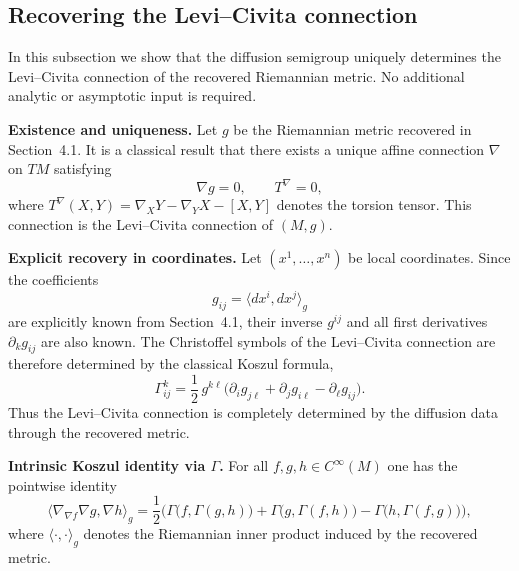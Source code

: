 \documentclass[11pt]{amsart}
\theoremstyle{definition}
\theoremstyle{remark}
\begin{document}
\subsection{Recovering the Levi--Civita connection}\label{subsec:recover-connection}

In this subsection we show that the diffusion semigroup uniquely determines the
Levi--Civita connection of the recovered Riemannian metric.
No additional analytic or asymptotic input is required.

\medskip
\noindent\textbf{Existence and uniqueness.}
Let $g$ be the Riemannian metric recovered in Section~4.1.
It is a classical result that there exists a unique affine connection $\nabla$
on $TM$ satisfying
\begin{equation}\label{eq:LC-conditions}
\nabla g = 0,
\qquad
T^\nabla = 0,
\end{equation}
where $T^\nabla(X,Y)=\nabla_XY-\nabla_YX-[X,Y]$ denotes the torsion tensor.
This connection is the Levi--Civita connection of $(M,g)$.

\medskip
\noindent\textbf{Explicit recovery in coordinates.}
Let $(x^1,\dots,x^n)$ be local coordinates.
Since the coefficients
\[
g_{ij} = \langle dx^i,dx^j\rangle_g
\]
are explicitly known from Section~4.1, their inverse $g^{ij}$ and all first
derivatives $\partial_k g_{ij}$ are also known.
The Christoffel symbols of the Levi--Civita connection are therefore determined
by the classical Koszul formula,
\begin{equation}\label{eq:Christoffel}
\Gamma^k_{ij}
=
\frac12\,g^{k\ell}
\big(
\partial_i g_{j\ell}
+
\partial_j g_{i\ell}
-
\partial_\ell g_{ij}
\big).
\end{equation}
Thus the Levi--Civita connection is completely determined by the diffusion data
through the recovered metric.

\medskip
\noindent\textbf{Intrinsic Koszul identity via $\Gamma$.}
For all $f,g,h\in C^\infty(M)$ one has the pointwise identity
\begin{equation}\label{eq:Koszul-Gamma}
\big\langle \nabla_{\nabla f}\nabla g,\nabla h\big\rangle_g
=
\frac12\Big(
\Gamma\big(f,\Gamma(g,h)\big)
+
\Gamma\big(g,\Gamma(f,h)\big)
-
\Gamma\big(h,\Gamma(f,g)\big)
\Big),
\end{equation}
where $\langle\cdot,\cdot\rangle_g$ denotes the Riemannian inner product induced by
the recovered metric.
\end{document}
